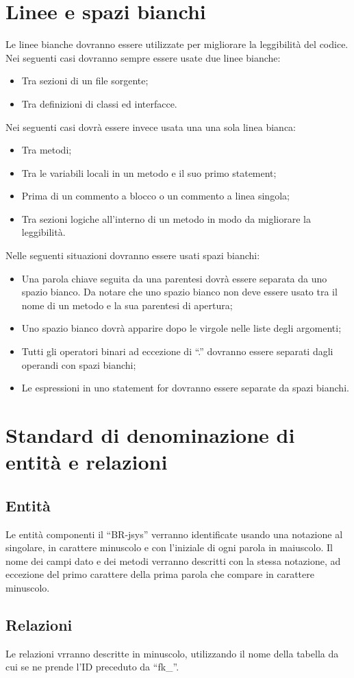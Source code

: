 \documentclass[11pt,titlepage,a4paper]{report}
\begin{document}
\section{Linee e spazi bianchi}
Le linee bianche dovranno essere utilizzate per migliorare la leggibilit\`a del codice. Nei seguenti casi dovranno sempre essere usate due linee bianche:
\begin{itemize}
\item Tra sezioni di un file sorgente;
\item Tra definizioni di classi ed interfacce.
\end{itemize}
Nei seguenti casi dovr\`a essere invece usata una una sola linea bianca:
\begin{itemize}
\item Tra metodi;
\item Tra le variabili locali in un metodo e il suo primo statement;
\item Prima di un commento a blocco o un commento a linea singola;
\item Tra sezioni logiche all'interno di un metodo in modo da migliorare la leggibilità.
\end{itemize}
Nelle seguenti situazioni dovranno essere usati spazi bianchi:
\begin{itemize}
\item Una parola chiave seguita da una parentesi dovr\`a essere separata da uno spazio bianco. Da notare che uno spazio bianco non deve essere usato tra il nome di un metodo e la sua parentesi di apertura;
\item Uno spazio bianco dovr\`a apparire dopo le virgole nelle liste degli argomenti;
\item Tutti gli operatori binari ad eccezione di “.” dovranno essere separati dagli operandi con spazi bianchi;
\item Le espressioni in uno statement for dovranno essere separate da spazi bianchi.
\end{itemize}

\section{Standard di denominazione di entit\`a e relazioni}
\subsection{Entit\`a}
Le entit\`a componenti il ``BR-jsys'' verranno identificate usando una notazione al singolare, in carattere minuscolo e con l'iniziale di ogni parola in maiuscolo. Il nome dei campi dato e dei metodi verranno descritti con la stessa notazione, ad eccezione del primo carattere della prima parola che compare in carattere minuscolo.
\subsection{Relazioni}
Le relazioni vrranno descritte in minuscolo, utilizzando il nome della tabella da cui se ne prende l'ID preceduto da ``fk_''.
\end{document}
